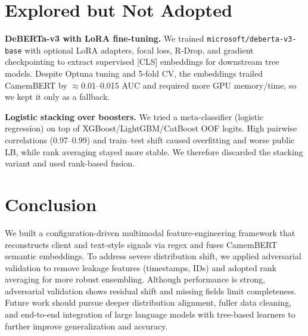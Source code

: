 \documentclass[twocolumn, a4paper, 10pt]{article}
\begin{document}
\section*{Explored but Not Adopted}

\textbf{DeBERTa-v3 with LoRA fine-tuning.} We trained \texttt{microsoft/deberta-v3-base} with optional LoRA adapters, focal loss, R-Drop, and gradient checkpointing to extract supervised [CLS] embeddings for downstream tree models. Despite Optuna tuning and 5-fold CV, the embeddings trailed CamemBERT by $\approx$0.01–0.015 AUC and required more GPU memory/time, so we kept it only as a fallback.

\textbf{Logistic stacking over boosters.} We tried a meta-classifier (logistic regression) on top of XGBoost/LightGBM/CatBoost OOF logits. High pairwise correlations (0.97–0.99) and train–test shift caused overfitting and worse public LB, while rank averaging stayed more stable. We therefore discarded the stacking variant and used rank-based fusion.

\section{Conclusion}

We built a configuration-driven multimodal feature-engineering framework that reconstructs client and text-style signals via regex and fuses CamemBERT semantic embeddings. To address severe distribution shift, we applied adversarial validation to remove leakage features (timestamps, IDs) and adopted rank averaging for more robust ensembling. Although performance is strong, adversarial validation shows residual shift and missing fields limit completeness. Future work should pursue deeper distribution alignment, fuller data cleaning, and end-to-end integration of large language models with tree-based learners to further improve generalization and accuracy.

\appendix
\end{document}
